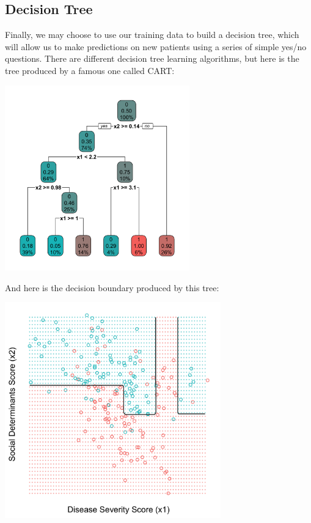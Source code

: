 \subsection{Decision Tree}

Finally, we may choose to use our training data to build a decision tree, which will allow us to make predictions on new patients using a series of simple yes/no questions. There are different decision tree learning algorithms, but here is the tree produced by a famous one called CART:
\begin{center}
\includegraphics[width=0.6\textwidth]{img/esl-decision-tree-just-tree.png}
\end{center}
And here is the decision boundary produced by this tree:
\begin{center}
\includegraphics[width=0.7\textwidth]{img/esl-decision-tree.png}
\end{center}

